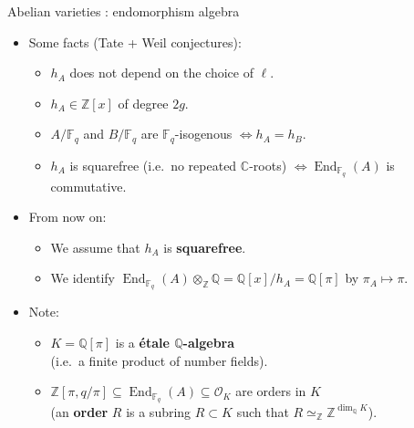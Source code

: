 \documentclass[usenames,dvipsnames,handout]{beamer}
\def\Q{\mathbb{Q}}
\def\Z{\mathbb{Z}}
\def\C{\mathbb{C}}
\def\F{\mathbb{F}}
\DeclareMathOperator{\End}{End}
\newcommand{\cO}{{\mathcal O}}
\begin{document}
\begin{frame}{ Abelian varieties : endomorphism algebra } 
    \begin{itemize}
    \item Some facts (Tate + Weil conjectures):
        \begin{itemize}
            \item \pause $h_A$ does not depend on the choice of $\ell$.
            \item \pause $h_A \in \Z[x]$ of degree $2g$.
            \item \pause $A/\F_q$ and $B/\F_q$ are $\F_q$-isogenous $\iff h_A=h_B$.
            \item \pause $h_A$ is squarefree (i.e.~no repeated $\C$-roots) $\iff \End_{\F_q}(A)$ is commutative. 
        \end{itemize}
    \item From now on:
        \begin{itemize}
            \item \pause We assume that $h_A$ is {\bf squarefree}.
            \item \pause We identify $\End_{\F_q}(A)\otimes_\Z\Q = \Q[x]/h_A=\Q[\pi]$ by $\pi_A \mapsto \pi$.
        \end{itemize}
    \item Note:
        \begin{itemize}
            \item \pause $K=\Q[\pi]$ is a {\bf \'etale $\Q$-algebra}\\
            (i.e.~a finite product of number fields).
            \item \pause $\Z[\pi,q/\pi] \subseteq \End_{\F_q}(A) \subseteq \cO_K$ are orders in $K$\\
            (an {\bf order} $R$ is a subring $R\subset K$ such that $R\simeq_\Z \Z^{\dim_\Q K}$).
        \end{itemize}    
	\end{itemize}
\end{frame}
\end{document}
